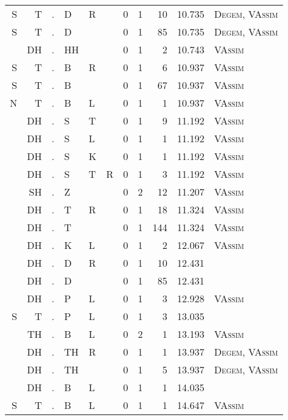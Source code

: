 \begin{longtable}{r@{ } r@{ } c@{ } l@{ } l@{ } l@{ } r r r r l }
S & T & . & D & R &   & 0 & 1 & 10 & 10.735 & \textsc{Degem}, \textsc{VAssim} \\
S & T & . & D &   &   & 0 & 1 & 85 & 10.735 & \textsc{Degem}, \textsc{VAssim} \\
  & DH & . & HH &   &   & 0 & 1 & 2 & 10.743 & \textsc{VAssim} \\
S & T & . & B & R &   & 0 & 1 & 6 & 10.937 & \textsc{VAssim} \\
S & T & . & B &   &   & 0 & 1 & 67 & 10.937 & \textsc{VAssim} \\
N & T & . & B & L &   & 0 & 1 & 1 & 10.937 & \textsc{VAssim} \\
  & DH & . & S & T &   & 0 & 1 & 9 & 11.192 & \textsc{VAssim} \\
  & DH & . & S & L &   & 0 & 1 & 1 & 11.192 & \textsc{VAssim} \\
  & DH & . & S & K &   & 0 & 1 & 1 & 11.192 & \textsc{VAssim} \\
  & DH & . & S & T & R & 0 & 1 & 3 & 11.192 & \textsc{VAssim} \\
  & SH & . & Z &   &   & 0 & 2 & 12 & 11.207 & \textsc{VAssim} \\
  & DH & . & T & R &   & 0 & 1 & 18 & 11.324 & \textsc{VAssim} \\
  & DH & . & T &   &   & 0 & 1 & 144 & 11.324 & \textsc{VAssim} \\
  & DH & . & K & L &   & 0 & 1 & 2 & 12.067 & \textsc{VAssim} \\
  & DH & . & D & R &   & 0 & 1 & 10 & 12.431 &  \\
  & DH & . & D &   &   & 0 & 1 & 85 & 12.431 &  \\
  & DH & . & P & L &   & 0 & 1 & 3 & 12.928 & \textsc{VAssim} \\
S & T & . & P & L &   & 0 & 1 & 3 & 13.035 &  \\
  & TH & . & B & L &   & 0 & 2 & 1 & 13.193 & \textsc{VAssim} \\
  & DH & . & TH & R &   & 0 & 1 & 1 & 13.937 & \textsc{Degem}, \textsc{VAssim} \\
  & DH & . & TH &   &   & 0 & 1 & 5 & 13.937 & \textsc{Degem}, \textsc{VAssim} \\
  & DH & . & B & L &   & 0 & 1 & 1 & 14.035 &  \\
S & T & . & B & L &   & 0 & 1 & 1 & 14.647 & \textsc{VAssim} \\
\bottomrule
\end{longtable}
